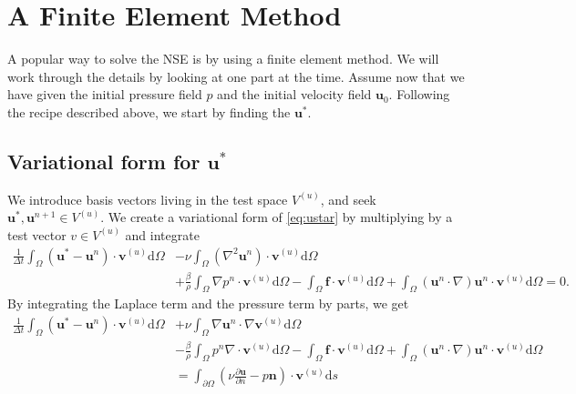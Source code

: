 \documentclass[a4paper,10pt]{article}
\renewcommand{\vec}[1]{\mathbf{#1}}
\renewcommand{\(}{\left(}
\renewcommand{\)}{\right)}
\newcommand{\dm}[1]{\text{d}#1}
\newcommand{\dpart}[2]{\frac{\partial#1}{\partial#2}}
\begin{document}
\section{A Finite Element Method}
A popular way to solve the NSE is by using a finite element method. We will work through the details by looking at one part at the time. Assume now that we have given the initial pressure field $p$ and the initial velocity field $\vec u_0$. Following the recipe described above, we start by finding the $\vec u^*$. 
\subsection{Variational form for $\vec u^*$}
We introduce basis vectors living in the test space $V^{(u)}$, and seek $\vec u^*, \vec u^{n+1} \in V^{(u)}$. We create a variational form of \eqref{eq:ustar} by multiplying by a test vector $v\in V^{(u)}$ and integrate
\begin{align*}
  \frac{1}{\Delta t}\int_\Omega(\vec u^* - \vec u^{n})\cdot\vec v^{(u)}\dm \Omega
  &- \nu\int_\Omega (\nabla^2\vec u^n)\cdot\vec v^{(u)} \dm \Omega\\
   &+ \frac{\beta}{\rho}\int_\Omega\nabla p^n \cdot\vec v^{(u)} \dm \Omega 
   - \int_\Omega\vec f\cdot\vec v^{(u)} \dm \Omega 
   + \int_\Omega(\vec u^n\cdot \nabla)\vec u^n\cdot\vec v^{(u)} \dm \Omega = 0.
\end{align*}
By integrating the Laplace term and the pressure term by parts, we get
\begin{align*}
  \frac{1}{\Delta t}\int_\Omega(\vec u^* - \vec u^{n})\cdot\vec v^{(u)}\dm \Omega
  &+ \nu\int_\Omega\nabla\vec u^n\cdot\nabla\vec v^{(u)} \dm \Omega\\
   &- \frac{\beta}{\rho}\int_\Omega p^n \nabla\cdot\vec v^{(u)} \dm \Omega 
   - \int_\Omega\vec f\cdot\vec v^{(u)} \dm \Omega 
   + \int_\Omega (\vec u^n\cdot \nabla)\vec u^n\cdot\vec v^{(u)} \dm \Omega\\
   &= \int_{\partial\Omega} (\nu\dpart{\vec u}{n} - p\vec n)\cdot\vec v^{(u)} \dm s
\end{align*}
\end{document}
